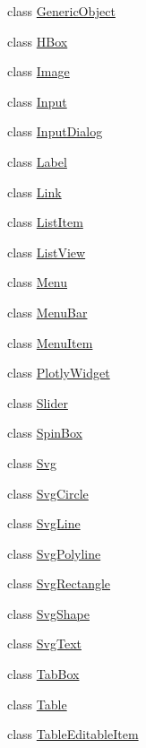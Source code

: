 \begin{DoxyCompactItemize}
class \hyperlink{classremi_1_1gui_1_1GenericObject}{Generic\+Object}
\item 
class \hyperlink{classremi_1_1gui_1_1HBox}{H\+Box}
\item 
class \hyperlink{classremi_1_1gui_1_1Image}{Image}
\item 
class \hyperlink{classremi_1_1gui_1_1Input}{Input}
\item 
class \hyperlink{classremi_1_1gui_1_1InputDialog}{Input\+Dialog}
\item 
class \hyperlink{classremi_1_1gui_1_1Label}{Label}
\item 
class \hyperlink{classremi_1_1gui_1_1Link}{Link}
\item 
class \hyperlink{classremi_1_1gui_1_1ListItem}{List\+Item}
\item 
class \hyperlink{classremi_1_1gui_1_1ListView}{List\+View}
\item 
class \hyperlink{classremi_1_1gui_1_1Menu}{Menu}
\item 
class \hyperlink{classremi_1_1gui_1_1MenuBar}{Menu\+Bar}
\item 
class \hyperlink{classremi_1_1gui_1_1MenuItem}{Menu\+Item}
\item 
class \hyperlink{classremi_1_1gui_1_1PlotlyWidget}{Plotly\+Widget}
\item 
class \hyperlink{classremi_1_1gui_1_1Slider}{Slider}
\item 
class \hyperlink{classremi_1_1gui_1_1SpinBox}{Spin\+Box}
\item 
class \hyperlink{classremi_1_1gui_1_1Svg}{Svg}
\item 
class \hyperlink{classremi_1_1gui_1_1SvgCircle}{Svg\+Circle}
\item 
class \hyperlink{classremi_1_1gui_1_1SvgLine}{Svg\+Line}
\item 
class \hyperlink{classremi_1_1gui_1_1SvgPolyline}{Svg\+Polyline}
\item 
class \hyperlink{classremi_1_1gui_1_1SvgRectangle}{Svg\+Rectangle}
\item 
class \hyperlink{classremi_1_1gui_1_1SvgShape}{Svg\+Shape}
\item 
class \hyperlink{classremi_1_1gui_1_1SvgText}{Svg\+Text}
\item 
class \hyperlink{classremi_1_1gui_1_1TabBox}{Tab\+Box}
\item 
class \hyperlink{classremi_1_1gui_1_1Table}{Table}
\item 
class \hyperlink{classremi_1_1gui_1_1TableEditableItem}{Table\+Editable\+Item}
\item 

\end{DoxyCompactItemize}
